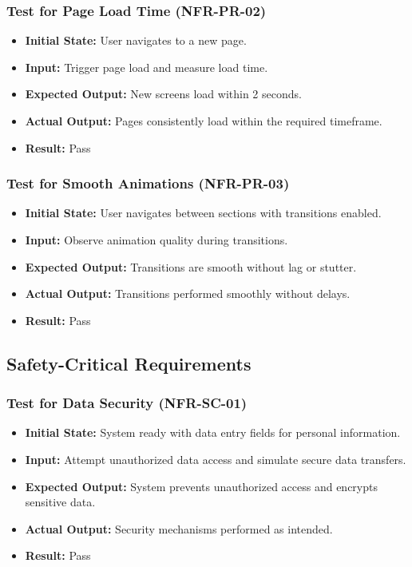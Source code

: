 \documentclass[12pt, titlepage]{article}
\begin{document}
\subsubsection{Test for Page Load Time (NFR-PR-02)}
\begin{itemize}
    \item \textbf{Initial State: }User navigates to a new page.
    \item \textbf{Input: }Trigger page load and measure load time.
    \item \textbf{Expected Output: }New screens load within 2 seconds.
    \item \textbf{Actual Output: }Pages consistently load within the required timeframe.
    \item \textbf{Result: }Pass
\end{itemize}

\subsubsection{Test for Smooth Animations (NFR-PR-03)}
\begin{itemize}
    \item \textbf{Initial State: }User navigates between sections with transitions enabled.
    \item \textbf{Input: }Observe animation quality during transitions.
    \item \textbf{Expected Output: }Transitions are smooth without lag or stutter.
    \item \textbf{Actual Output: }Transitions performed smoothly without delays.
    \item \textbf{Result: }Pass
\end{itemize}

\subsection{Safety-Critical Requirements}

\subsubsection{Test for Data Security (NFR-SC-01)}
\begin{itemize}
    \item \textbf{Initial State: }System ready with data entry fields for personal information.
    \item \textbf{Input: }Attempt unauthorized data access and simulate secure data transfers.
    \item \textbf{Expected Output: }System prevents unauthorized access and encrypts sensitive data.
    \item \textbf{Actual Output: }Security mechanisms performed as intended.
    \item \textbf{Result: }Pass
\end{itemize}
\end{document}
